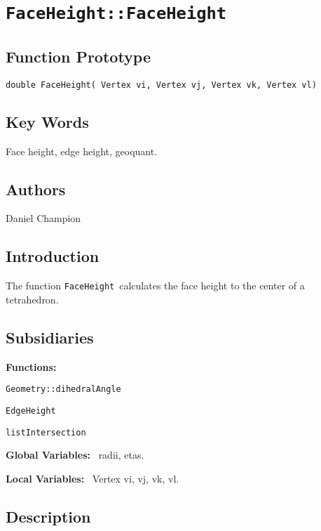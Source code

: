                       

\section*{\texttt{FaceHeight::FaceHeight\label{Face Height FUNCTION}}}

\subsection*{Function Prototype}

\texttt{double FaceHeight( Vertex vi, Vertex vj, Vertex vk, Vertex vl)}

\subsection*{Key Words}

Face height, edge height, geoquant.

\subsection*{Authors}

Daniel Champion

\subsection*{Introduction}

The function \texttt{FaceHeight}\ calculates the face height to the center
of a tetrahedron. \ 

\subsection*{Subsidiaries}

\textbf{Functions:}

\qquad\texttt{Geometry::dihedralAngle}

\qquad \texttt{EdgeHeight}

\qquad\texttt{listIntersection}

\textbf{Global Variables: }\ radii, etas.

\textbf{Local Variables:} \ Vertex vi, vj, vk, vl.

\subsection*{Description}

